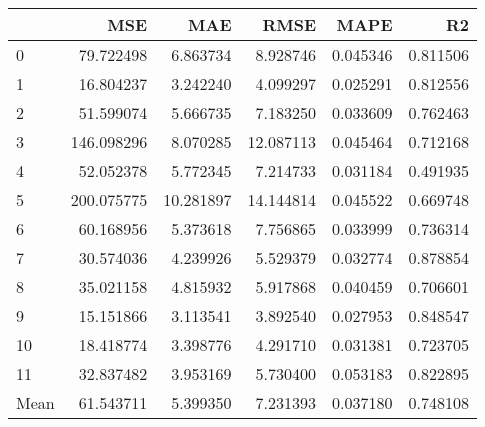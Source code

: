 \begin{tabular}{lrrrrr}
\toprule
 & MSE & MAE & RMSE & MAPE & R2 \\
\midrule
0 & 79.722498 & 6.863734 & 8.928746 & 0.045346 & 0.811506 \\
1 & 16.804237 & 3.242240 & 4.099297 & 0.025291 & 0.812556 \\
2 & 51.599074 & 5.666735 & 7.183250 & 0.033609 & 0.762463 \\
3 & 146.098296 & 8.070285 & 12.087113 & 0.045464 & 0.712168 \\
4 & 52.052378 & 5.772345 & 7.214733 & 0.031184 & 0.491935 \\
5 & 200.075775 & 10.281897 & 14.144814 & 0.045522 & 0.669748 \\
6 & 60.168956 & 5.373618 & 7.756865 & 0.033999 & 0.736314 \\
7 & 30.574036 & 4.239926 & 5.529379 & 0.032774 & 0.878854 \\
8 & 35.021158 & 4.815932 & 5.917868 & 0.040459 & 0.706601 \\
9 & 15.151866 & 3.113541 & 3.892540 & 0.027953 & 0.848547 \\
10 & 18.418774 & 3.398776 & 4.291710 & 0.031381 & 0.723705 \\
11 & 32.837482 & 3.953169 & 5.730400 & 0.053183 & 0.822895 \\
Mean & 61.543711 & 5.399350 & 7.231393 & 0.037180 & 0.748108 \\
\bottomrule
\end{tabular}

